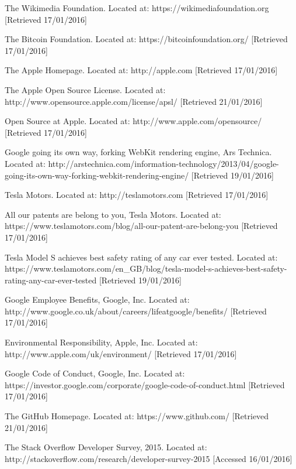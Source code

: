 \begin{thebibliography}{100}
 The Wikimedia Foundation.
  Located at: https://wikimediafoundation.org [Retrieved 17/01/2016]

 The Bitcoin Foundation.
  Located at: https://bitcoinfoundation.org/ [Retrieved 17/01/2016]

 The Apple Homepage.
  Located at: http://apple.com [Retrieved 17/01/2016]
  
  The Apple Open Source License.
  Located at: http://www.opensource.apple.com/license/apsl/  [Retrieved 21/01/2016]

 Open Source at Apple.
  Located at: http://www.apple.com/opensource/ [Retrieved 17/01/2016]

 Google going its own way, forking WebKit rendering engine,
    Ars Technica.
    Located at: http://arstechnica.com/information-technology/2013/04/google-going-its-own-way-forking-webkit-rendering-engine/ [Retrieved 19/01/2016]

 Tesla Motors.
  Located at: http://teslamotors.com [Retrieved 17/01/2016]

 All our patents are belong to you,
  Tesla Motors.
  Located at: https://www.teslamotors.com/blog/all-our-patent-are-belong-you [Retrieved 17/01/2016]

 Tesla Model S achieves best safety rating of any car ever tested.
	Located at: https://www.teslamotors.com/en\_GB/blog/tesla-model-s-achieves-best-safety-rating-any-car-ever-tested [Retrieved 19/01/2016]

 Google Employee Benefits,
  Google, Inc.
  Located at: http://www.google.co.uk/about/careers/lifeatgoogle/benefits/ [Retrieved 17/01/2016]

 Environmental Responsibility,
  Apple, Inc.
  Located at: http://www.apple.com/uk/environment/ [Retrieved 17/01/2016]

 Google Code of Conduct,
  Google, Inc.
  Located at: https://investor.google.com/corporate/google-code-of-conduct.html [Retrieved 17/01/2016]

 The GitHub Homepage.
  Located at: https://www.github.com/  [Retrieved 21/01/2016]

 The Stack Overflow Developer Survey,
    2015.
	Located at: http://stackoverflow.com/research/developer-survey-2015 [Accessed 16/01/2016]
    

\end{thebibliography}
